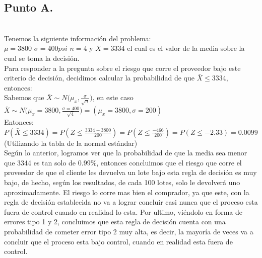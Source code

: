 \documentclass[letterpaper,12pt,onecolumn,titlepage]{article}
\begin{document}
\subsection{Punto A.}
~\\ Tenemos la siguiente informaci\'{o}n del problema:
~\\ $\mu=3800$  $\sigma=400psi$ $n=4$ y $\bar{X}=3334$ el cual es el valor de la media sobre la cual se toma la decisi\'{o}n.
~\\ Para responder a la pregunta sobre el riesgo que corre el proveedor bajo este criterio de decisi\'{o}n, decidimos calcular la probabilidad de que $\bar{X}\leq3334$, entonces:
~\\ Sabemos que $\bar{X}\sim{N(\mu_x,\frac{\sigma}{\sqrt{n}}})$, en este caso $\bar{X}\sim{N(\mu_x=3800,\frac{\sigma=400}{\sqrt{4}}})=(\mu_x=3800,\sigma=200)$
~\\Entonces:
~\\ $P(\bar{X}\leq3334)=P(Z\leq\frac{3334-3800}{200})=P(Z\leq\frac{-466}{200})=P(Z\leq-2.33)=0.0099$ (Utilizando la tabla de la normal est\'{a}ndar)
~\\Seg\'{u}n lo anterior, logramos ver que la probabilidad de que la media sea menor que 3344 es tan solo de 0.99\%, entonces concluimos que el riesgo que corre el proveedor de que el cliente les devuelva un lote bajo esta regla de decisi\'{o}n es muy bajo, de hecho, seg\'{u}n los resultados, de cada 100 lotes, solo le devolver\'{a} uno aproximadamente. El riesgo lo corre mas bien el comprador, ya que este, con la regla de decisi\'{o}n establecida no va a lograr concluir casi nunca que el proceso esta fuera de control cuando en realidad lo esta. Por ultimo, vi\'{e}ndolo en forma de errores tipo 1 y 2, concluimos que esta regla de decisi\'{o}n cuenta con una probabilidad de cometer error tipo 2 muy alta, es decir, la mayor\'{i}a de veces va a concluir que el proceso esta bajo control, cuando en realidad esta fuera de control.
\end{document}
